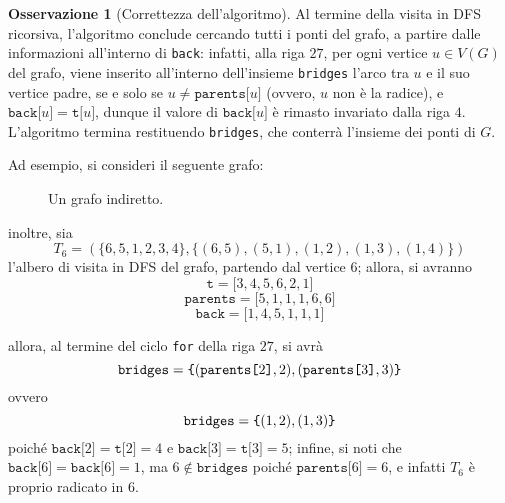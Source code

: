 \documentclass[14pt]{extreport}
\theoremstyle{definition}
\theoremstyle{definition}
\newtheorem{remark}{Osservazione}[subsection]
\begin{document}
\begin{remark}[Correttezza dell'algoritmo]
    Al termine della visita in DFS ricorsiva, l'algoritmo conclude cercando tutti i ponti del grafo, a partire dalle informazioni all'interno di \texttt{back}: infatti, alla riga $27$, per ogni vertice $u \in V(G)$ del grafo, viene inserito all'interno dell'insieme \texttt{bridges} l'arco tra $u$ e il suo vertice padre, se e solo se $u \neq \texttt{parents[}u\texttt{]}$ (ovvero, $u$ non è la radice), e $\texttt{back[}u\texttt{]} = \texttt{t[}u\texttt{]}$, dunque il valore di $\texttt{back[}u\texttt{]}$ è rimasto invariato dalla riga $4$. L'algoritmo termina restituendo \texttt{bridges}, che conterrà l'insieme dei ponti di $G$.

    Ad esempio, si consideri il seguente grafo:

    \begin{figure}[H]
        \centering
        \caption{Un grafo indiretto.}
    \end{figure}

    inoltre, sia $$T_6 = (\{6, 5, 1, 2, 3, 4\}, \{(6, 5), (5, 1), (1, 2), (1, 3), (1, 4)\})$$ l'albero di visita in DFS del grafo, partendo dal vertice $6$; allora, si avranno $$\texttt{t} = \texttt{[}3, 4, 5, 6, 2, 1\texttt{]}$$ $$\texttt{parents} = \texttt{[}5, 1, 1, 1, 6, 6\texttt{]}$$ $$\texttt{back} = \texttt{[}1, 4, 5, 1, 1, 1\texttt{]}$$

    allora, al termine del ciclo \texttt{for} della riga $27$, si avrà $$\texttt{bridges} = \verb|{| (\texttt{parents[}2\texttt{]}, 2), (\texttt{parents[}3\texttt{]}, 3)\verb|}|$$ ovvero $$\texttt{bridges} = \verb|{| (1, 2), (1, 3)\verb|}|$$ poiché $\texttt{back[}2\texttt{]} = \texttt{t[}2\texttt{]} = 4$ e $\texttt{back[}3\texttt{]} = \texttt{t[}3\texttt{]} = 5$; infine, si noti che $\texttt{back[}6\texttt{]} = \texttt{back[}6\texttt{]} = 1$, ma $6 \notin \texttt{bridges}$ poiché $\texttt{parents[}6\texttt{]} = 6$, e infatti $T_6$ è proprio radicato in $6$.
\end{remark}
\end{document}
